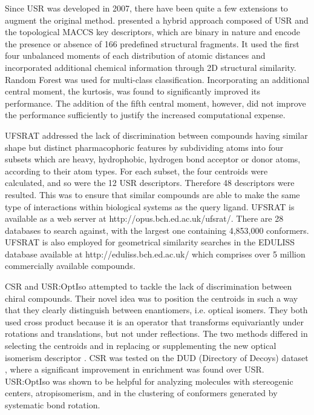 Since USR was developed in 2007, there have been quite a few extensions \citep{1333,1436,1437,1334,1335,1337,1338,1331,1407,1408} to augment the original method. \citep{1333} presented a hybrid approach composed of USR and the topological MACCS key descriptors, which are binary in nature and encode the presence or absence of 166 predefined structural fragments. It used the first four unbalanced moments of each distribution of atomic distances and incorporated additional chemical information through 2D structural similarity. Random Forest \citep{1310} was used for multi-class classification. Incorporating an additional central moment, the kurtosis, was found to significantly improved its performance. The addition of the fifth central moment, however, did not improve the performance sufficiently to justify the increased computational expense.

UFSRAT \citep{1436} addressed the lack of discrimination between compounds having similar shape but distinct pharmacophoric
features by subdividing atoms into four subsets which are heavy, hydrophobic, hydrogen bond acceptor or donor atoms, according to their atom types. For each subset, the four centroids were calculated, and so were the 12 USR descriptors. Therefore 48 descriptors were resulted. This was to ensure that similar compounds are able to make the same type of interactions within biological systems as the query ligand. UFSRAT is available as a web server at http://opus.bch.ed.ac.uk/ufsrat/. There are 28 databases to search against, with the largest one containing 4,853,000 conformers. UFSRAT is also employed for geometrical similarity searches in the EDULISS database \citep{1437} available at http://eduliss.bch.ed.ac.uk/ which comprises over 5 million commercially available compounds.

CSR \citep{1334} and USR:OptIso \citep{1335} attempted to tackle the lack of discrimination between chiral compounds. Their novel idea was to position the centroids in such a way that they clearly distinguish between enantiomers, i.e. optical isomers. They both used cross product because it is an operator that transforms equivariantly under rotations and translations, but not under reflections. The two methods differed in selecting the centroids and in replacing or supplementing the new optical isomerism descriptor \citep{1335}. CSR \citep{1334} was tested on the DUD (Directory of Decoys) dataset \citep{87}, where a significant improvement in enrichment was found over USR. USR:OptIso \citep{1335} was shown to be helpful for analyzing molecules with stereogenic centers, atropisomerism, and in the clustering of conformers generated by systematic bond rotation.

